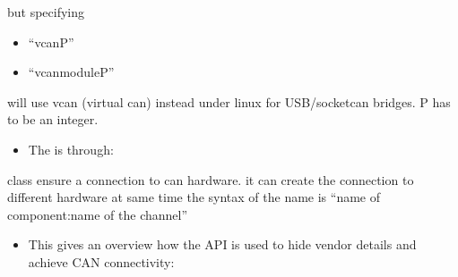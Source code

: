 \documentclass[letterpaper,10pt,english]{sphinxmanual}
\begin{document}
but specifying
\begin{itemize}
\item {} 
“vcanP”

\item {} 
“vcanmoduleP”

\end{itemize}

will use vcan (virtual can) instead under linux for USB/socketcan bridges. P has to be an integer.
\begin{itemize}
\item {} 
The  is through:

\end{itemize}

\begin{fulllineitems}
\label{\detokenize{standardApi:_CPPv4N9CanModule12CanBusAccessE}}%
\pysigstartmultiline
{}\label{\detokenize{standardApi:classCanModule_1_1CanBusAccess}}%
\pysigstopmultiline
{\hyperref[\detokenize{standardApi:classCanModule_1_1CanBusAccess}]{}} class ensure a connection to can hardware. it can create the connection to different hardware at same time the syntax of the name is “name of component:name of the channel” 

\end{fulllineitems}

\begin{itemize}
\item {} 
This  gives an overview how the API is used to hide vendor details and achieve CAN connectivity:

\end{itemize}
\end{document}
